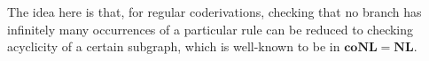 \documentclass[manuscript,screen]{acmart}
\theoremstyle{definition}
\theoremstyle{remark}
\newcommand{\n}{N}
\newcommand{\sq}{\Box}
\newcommand{\der}{\mathcal{D}}
\newcommand{\cut}{\mathsf{cut}}
\begin{document}
The idea here is that, for regular coderivations, checking that no branch has infinitely many occurrences of a particular rule can be reduced to checking acyclicity of a certain subgraph, which is well-known to be in $\mathbf{coNL}=\mathbf{NL}$.
\end{document}
